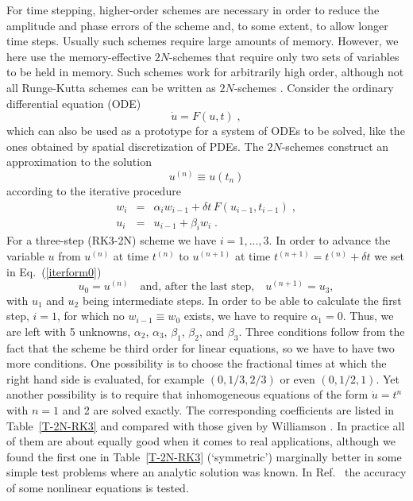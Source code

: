 \documentclass[\mydriver,12pt,twoside,notitlepage,a4paper]{article}
\newcommand{\Eq}[1]{Eq.~(\ref{#1})}
\begin{document}
For time stepping, higher-order schemes are necessary in order to reduce
the amplitude and phase errors of the scheme and, to some extent, to allow
longer time steps.
Usually such schemes require large amounts of memory.
However, we here use the memory-effective $2N$-schemes that require only
two sets of variables to be held in memory.
Such schemes work for
arbitrarily high order, although not all Runge-Kutta schemes can be
written as $2N$-schemes \cite{2Nstorage,SH88}.
Consider the ordinary differential equation (ODE)
\begin{equation}
  \dot{u} = F(u,t) \; ,
\end{equation}
which can also be used as a prototype for a system of ODEs to be solved,
like the ones obtained by spatial discretization of PDEs.
The $2N$-schemes construct an approximation to the solution
\begin{equation}
  u^{(n)} \equiv u(t_n)
\end{equation}
according to the iterative procedure
\begin{eqnarray}
  w_i &=& \alpha_i w_{i-1}+\delta t\,F(u_{i-1},t_{i-1}) \;, \\
  u_i &=& u_{i-1}+\beta_i w_i \;.
\label{iterform0}
\end{eqnarray}
For a three-step (RK3-2N) scheme we have $i=1,...,3$.
In order to advance the variable $u$ from $u^{(n)}$ at time $t^{(n)}$
to $u^{(n+1)}$ at time $t^{(n+1)}=t^{(n)}+\delta t$ we set in \Eq{iterform0}
\begin{equation}
  u_0=u^{(n)}
  \quad\mbox{and, after the last step,}\quad
  u^{(n+1)}=u_3,
\end{equation}
with $u_1$ and $u_2$ being intermediate steps. In order to be able to
calculate the first step, $i=1$, for which no $w_{i-1}\equiv w_0$ exists,
we have to require $\alpha_1=0$. Thus, we are left with 5 unknowns,
$\alpha_2$, $\alpha_3$, $\beta_1$, $\beta_2$, and $\beta_3$. Three
conditions follow from the fact that the scheme be third order
for linear equations, so we
have to have two more conditions. One possibility is to choose the
fractional times at which the right hand side is evaluated, for
example $(0,1/3,2/3)$ or even $(0,1/2,1)$.
Yet another possibility is to require that
inhomogeneous equations of the form $\dot{u}=t^n$ with $n=1$ and 2 are
solved exactly.
The corresponding coefficients are listed in Table~\ref{T-2N-RK3} and compared
with those given by Williamson \cite{2Nstorage}. In practice all of them
are about equally good when it comes to real applications, although
we found the first one in Table~\ref{T-2N-RK3} (`symmetric') marginally better in some
simple test problems where an analytic solution was known.
In Ref.~\cite{Ref-1} the accuracy of some nonlinear equations is tested.
\end{document}
